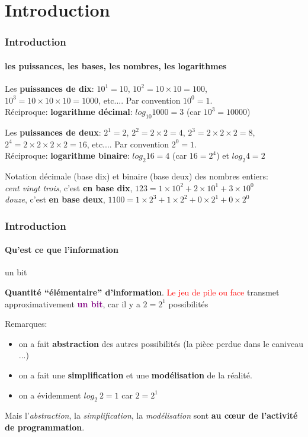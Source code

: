 \documentclass[xcolor=svgnames,final,smaller,a4]{beamer}
\begin{document}
\section{Introduction}

\begin{frame}
  \frametitle{Introduction}
  \framesubtitle{les puissances, les bases, les nombres, les logarithmes}

  Les \textbf{puissances de dix}: $10^1 = 10$, $10^2 = 10 \times 10 = 100$,
  $10^3 = 10 \times 10 \times 10 = 1000$, etc.... Par convention $10^0 = 1$. \\
  Réciproque: \textbf{logarithme décimal}: $log_{10} 1000 = 3$ (car $10^3 = 10000$)

  \vspace{0.5cm}
  
  Les  \textbf{puissances de deux}: $2^1 = 2$, $2^2 = 2 \times 2 = 4$, $2^3 = 2 \times 2 \times 2 = 8$, $2^4 = 2 \times 2 \times 2  \times 2 = 16$, etc.... Par convention $2^0 = 1$. \\ Réciproque: \textbf{logarithme binaire}: $log_2 16 = 4$ (car $16 = 2^4$) et $log_2 4 = 2$

  \vspace{0.5cm}

  Notation décimale (base dix) et binaire (base deux) des nombres entiers: \\
  \emph{cent vingt trois}, c'est \textbf{en base dix}, $123 = 1 \times 10^2 + 2 \times 10^1 + 3 \times 10^0$ \\
  \emph{douze}, c'est \textbf{en base deux}, $1100 = 1 \times 2^3 + 1 \times 2^2 + 0 \times 2^1 + 0 \times 2^0$
\end{frame}


\begin{frame}
  \frametitle{Introduction}
  \framesubtitle{Qu'est ce que l'information}

  \begin{block}{un bit}

    \textbf{Quantité ``élémentaire'' d'information}. \textcolor{red}{Le jeu de pile ou face} transmet approximativement \textcolor{purple}{\textbf{un bit}}, car il y a $2 = 2^1$ possibilités
    
  \end{block}

  Remarques:
  \begin{itemize}
  \item on a fait \textbf{abstraction} des autres possibilités (la pièce perdue dans le caniveau ...)
  \item on a fait une \textbf{simplification} et une \textbf{modélisation} de la réalité.
    \item on a évidemment $log_2 ~ 2 = 1$ car $2 = 2^1$
  \end{itemize}

  Mais l'\emph{abstraction}, la \emph{simplification}, la \emph{modélisation} sont \textbf{au c{\oe}ur de l'activité de programmation}.
  
\end{frame}
\end{document}
